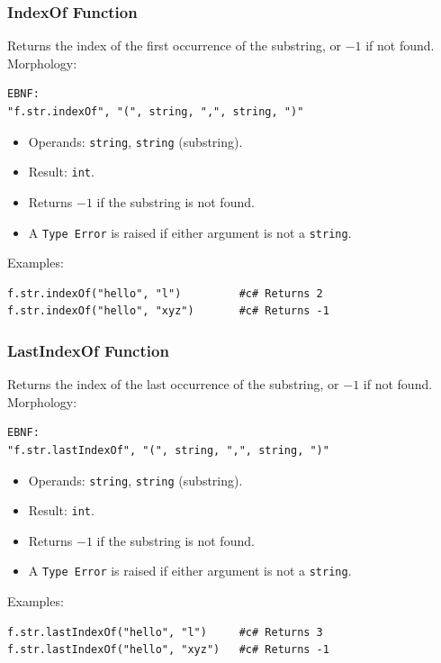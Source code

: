 \subsubsection{IndexOf Function}
Returns the index of the first occurrence of the substring, or $-1$ if not found. \\
Morphology:
\begin{verbatim}
EBNF:
"f.str.indexOf", "(", string, ",", string, ")"
\end{verbatim}
\begin{itemize}
\item Operands: \texttt{string}, \texttt{string} (substring).
\item Result: \texttt{int}.
\item Returns $-1$ if the substring is not found.
\item A \texttt{Type Error} is raised if either argument is not a \texttt{string}.
\end{itemize}
Examples:
\begin{verbatim}
f.str.indexOf("hello", "l")         #c# Returns 2
f.str.indexOf("hello", "xyz")       #c# Returns -1
\end{verbatim}

\subsubsection{LastIndexOf Function}
Returns the index of the last occurrence of the substring, or $-1$ if not found. \\
Morphology:
\begin{verbatim}
EBNF:
"f.str.lastIndexOf", "(", string, ",", string, ")"
\end{verbatim}
\begin{itemize}
\item Operands: \texttt{string}, \texttt{string} (substring).
\item Result: \texttt{int}.
\item Returns $-1$ if the substring is not found.
\item A \texttt{Type Error} is raised if either argument is not a \texttt{string}.
\end{itemize}
Examples:
\begin{verbatim}
f.str.lastIndexOf("hello", "l")     #c# Returns 3
f.str.lastIndexOf("hello", "xyz")   #c# Returns -1
\end{verbatim}

